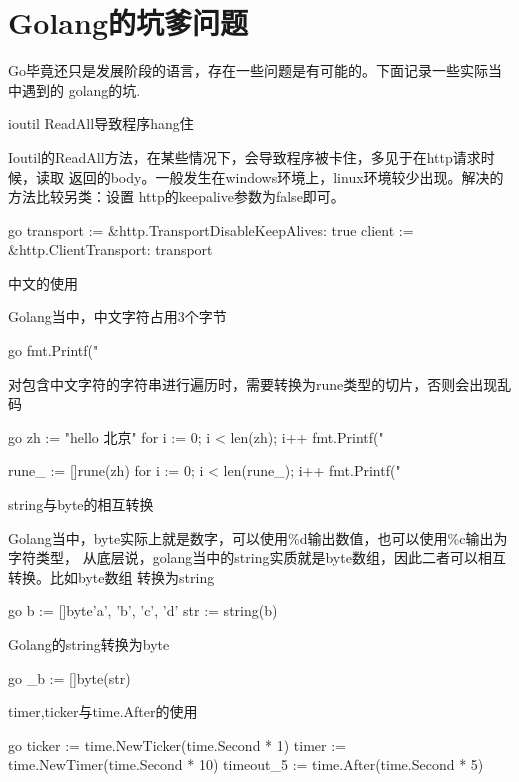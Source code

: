 \section{Golang的坑爹问题}
Go毕竟还只是发展阶段的语言，存在一些问题是有可能的。下面记录一些实际当中遇到的
golang的坑.
\begin{outline}[enumerate]

  \1 ioutil ReadAll导致程序hang住

  Ioutil的ReadAll方法，在某些情况下，会导致程序被卡住，多见于在http请求时候，读取
  返回的body。一般发生在windows环境上，linux环境较少出现。解决的方法比较另类：设置
  http的keepalive参数为false即可。
\begin{code-in-enumerate}{go}
transport := &http.Transport{DisableKeepAlives: true}
client := &http.Client{Transport: transport}
\end{code-in-enumerate}

  \1 中文的使用

  Golang当中，中文字符占用3个字节
\begin{code-in-enumerate}{go}
fmt.Printf("%
\end{code-in-enumerate}

  对包含中文字符的字符串进行遍历时，需要转换为rune类型的切片，否则会出现乱码
\begin{code-in-enumerate}{go}
zh := "hello 北京"
for i := 0; i < len(zh); i++ {
    fmt.Printf("%
}

rune_ := []rune(zh)
for i := 0; i < len(rune_); i++ {
    fmt.Printf("%
}
\end{code-in-enumerate}

  \1 string与byte的相互转换

  Golang当中，byte实际上就是数字，可以使用\%d输出数值，也可以使用\%c输出为字符类型，
  从底层说，golang当中的string实质就是byte数组，因此二者可以相互转换。比如byte数组
  转换为string
\begin{code-in-enumerate}{go}
b := []byte{'a', 'b', 'c', 'd'}
str := string(b)
\end{code-in-enumerate}

  Golang的string转换为byte
\begin{code-in-enumerate}{go}
_b := []byte(str)
\end{code-in-enumerate}

  \1 timer,ticker与time.After的使用

\begin{code-in-enumerate}{go}
ticker := time.NewTicker(time.Second * 1)
timer := time.NewTimer(time.Second * 10)
timeout_5 := time.After(time.Second * 5)


\end{code-in-enumerate}
\end{outline}
